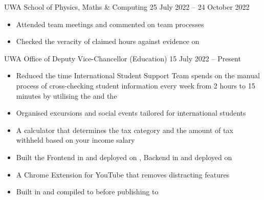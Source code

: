 \documentclass[paper=a4,fontsize=10pt]{resume}
\begin{document}
{		\divider

			{UWA School of Physics, Maths \& Computing}
			{25 July 2022 -- 24 October 2022}
		\begin{itemize}
			\item Attended team meetings and commented on team processes
			\item Checked the veracity of claimed hours against evidence on 
		\end{itemize}

		\divider

			{UWA Office of Deputy Vice-Chancellor (Education)}
			{15 July 2022 -- Present}
		\begin{itemize}
			\item Reduced the time International Student Support Team spends on the manual process of cross-checking student information every week from 2 hours to 15 minutes by utilising the  and the 
			\item Organised excursions and social events tailored for international students
		\end{itemize}

		\begin{itemize}
			\item A calculator that determines the tax category and the amount of tax withheld based on your income salary
			\item Built the Frontend in  and deployed on , Backend in  and deployed on 
		\end{itemize}

		\divider

		\begin{itemize}
			\item A Chrome Extension for YouTube that removes distracting features
			\item Built in  and compiled to  before publishing to 
		\end{itemize}
}

\makebody
\end{document}

